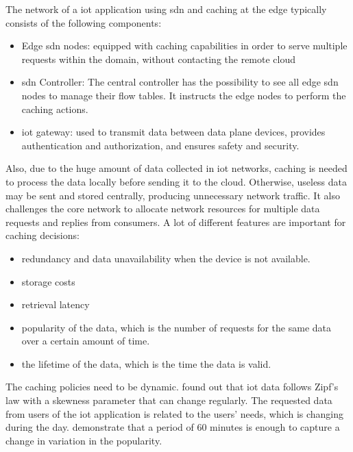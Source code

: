\documentclass[conference]{IEEEtran}
\begin{document}
	The network of a \ac{iot} application using \ac{sdn} and caching at the edge typically consists of the following components:
	\begin{itemize}
		\item Edge \ac{sdn} nodes: equipped with caching capabilities in order to serve multiple requests within the domain, without contacting the remote cloud \cite{caching-1} \cite{caching-2}  
		\item \ac{sdn} Controller: The central controller has the possibility to see all edge \ac{sdn} nodes to manage their flow tables. It instructs the edge nodes to perform the caching actions. \cite{caching-1} \cite{caching-2}  
		\item \ac{iot} gateway: used to transmit data between data plane devices, provides authentication and authorization, and ensures safety and security. \cite{caching-1}
	\end{itemize}

	Also, due to the huge amount of data collected in \ac{iot} networks, caching is needed to process the data locally before sending it to the cloud. Otherwise, useless data may be sent and stored centrally, producing unnecessary network traffic. \cite{caching-1} It also challenges the core network to allocate network resources for multiple data requests and replies from consumers. \cite{caching-2}
	A lot of different features are important for caching decisions:

	\begin{itemize}
		\item redundancy and data unavailability when the device is not available. \cite{caching-1}
		\item storage costs
		\item retrieval latency
		\item popularity of the data, which is the number of requests for the same data over a certain amount of time. \cite{caching-2}
		\item the lifetime of the data, which is the time the data is valid. \cite{caching-2}
	\end{itemize}

	The caching policies need to be dynamic. \cite{caching-5} found out that \ac{iot} data follows Zipf's law with a skewness parameter that can change regularly. The requested data from users of the \ac{iot} application is related to the users' needs, which is changing during the day. \citeauthor{caching-5} demonstrate that a period of 60 minutes is enough to capture a change in variation in the popularity.  
\end{document}
